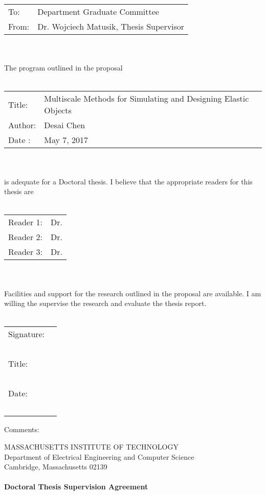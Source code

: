 \documentclass[11pt]{article}
\begin{document}
\begin{tabular}{p{2cm} p{10cm}}
	To: & Department Graduate Committee \\
	From: & Dr. Wojciech Matusik, Thesis Supervisor
\end{tabular}\\~\\
The program outlined in the proposal\\~\\
\begin{tabular}{p{2cm} l}
	Title: & Multiscale Methods for Simulating and Designing Elastic Objects\\
	Author: & Desai Chen\\
	Date : & May 7, 2017
\end{tabular}\\~\\
is adequate for a Doctoral thesis. I believe that the appropriate readers for this thesis are\\~\\
\begin{tabular}{p{2cm} l}
	Reader 1: & Dr.\\
	Reader 2: & Dr.\\
	Reader 3: & Dr.
\end{tabular}\\~\\
Facilities and support for the research outlined in the proposal are available.
I am willing the supervise the research and evaluate the thesis report.\\~\\
\begin{flushright}
	\begin{tabular}{l l}
		Signature: & \underline{\hspace{6cm}}\\~\\
		Title: & \underline{\hspace{6cm}}\\~\\
		Date: & \underline{\hspace{6cm}}\\~\\
	\end{tabular}
\end{flushright}
Comments:
\newpage
\begin{center}
	MASSACHUSETTS INSTITUTE OF TECHNOLOGY\\
	Department of Electrical Engineering and Computer Science\\
	Cambridge, Massachusetts 02139\\~\\
	\textbf{Doctoral Thesis Supervision Agreement}\\~\\
\end{center}
\end{document}
